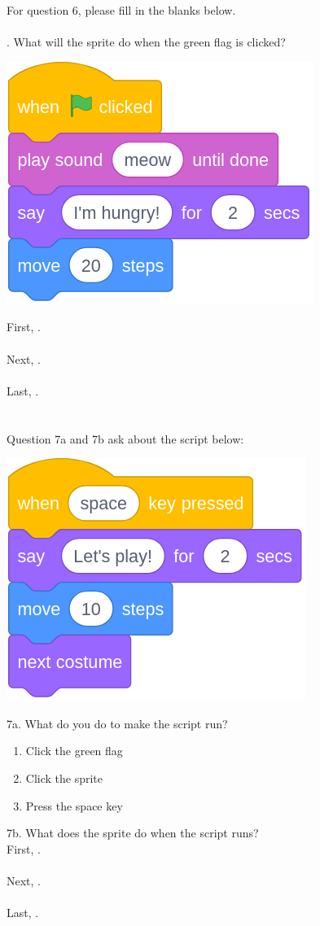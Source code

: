 \documentclass[letterpaper,12pt]{article}
\begin{document}
\noindent For question 6, please fill in the blanks below. \\ \\
. What will the sprite do when the green flag is clicked?
\begin{center}
\includegraphics[scale=.3]{q6_script0.png}
\end{center}

\noindent First, \hrulefill . \\ \\
Next, \hrulefill . \\ \\
Last, \hrulefill . \\ \\

\noindent \dotfill \\
Question 7a and 7b ask about the script below:
\begin{center}
\includegraphics[scale=.3]{q7_script0.png}
\end{center}

\noindent 7a. What do you do to make the script run?
\renewcommand{\theenumi}{\Alph{enumi}}
\begin{enumerate}
\item Click the green flag
\item Click the sprite
\item Press the space key \\
\end{enumerate}

\noindent 7b. What does the sprite do when the script runs? \\

\noindent First, \hrulefill . \\ \\
Next, \hrulefill . \\ \\
Last, \hrulefill . \\
\end{document}
